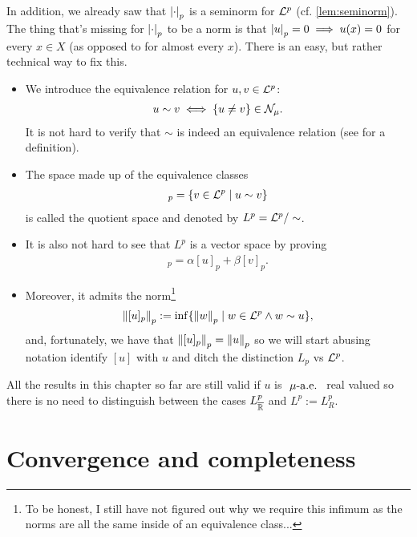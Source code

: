 In addition, we already saw that $\left\vert{\cdot}\right\vert_p$ is a seminorm for $\mathcal{L}^p$ (cf. \autoref{lem:seminorm}). The thing that's missing for $\left\vert{\cdot}\right\vert_p$ to be a norm is that $\left\vert{u}\right\vert_p = 0 \implies u(x) = 0$ for every $x \in X$ (as opposed to for almost every $x$). There is an easy, but rather technical way to fix this.

\begin{itemize}
	\item We introduce the equivalence relation for $u, v\in \mathcal{L}^p$:
	\begin{align*}
		u \sim v \iff \{u \neq v \} \in \mathcal{N}_\mu.
	\end{align*}
	It is not hard to verify that $\sim$ is indeed an equivalence relation (see \cite{wiki-equiv} for a definition).
	
	\item The space made up of the equivalence classes
	\begin{align*}
		[u]_p = \{ v \in \Lp \mid u \sim v\}
	\end{align*}
	is called the quotient space and denoted by $L^p = \mathcal{L}^p / \sim$.
	
	\item It is also not hard to see that $L^p$ is a vector space by proving
	\begin{align*}
		[\alpha u + \beta v]_p = \alpha[u]_p + \beta[v]_p.
	\end{align*}
	
	\item Moreover, it admits the norm\footnote{To be honest, I still have not figured out why we require this infimum as the norms are all the same inside of an equivalence class...}
	\begin{align*}
		\left\Vert{[u]_p}\right\Vert_p := \inf \{ \left\Vert{w}\right\Vert_p \mid w \in \mathcal{L}^p \land w \sim u\},
	\end{align*}
	and, fortunately, we have that $\left\Vert{[u]_p}\right\Vert_p = \left\Vert{u}\right\Vert_p$ so we will start abusing notation identify $[u]$ with $u$ and ditch the distinction $L_p$ vs $\mathcal{L}^p$.
\end{itemize}

All the results in this chapter so far are still valid if $u$ is $\ \mu\text{-a.e. }$ real valued so there is no need to distinguish between the cases $L^p_{\overline{\mathbb{R}}}$ and $L^p := L^p_R$.

\section{Convergence and completeness}

